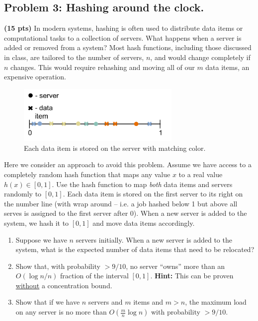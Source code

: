 \documentclass[10pt]{article}
\begin{document}
\subsection{Problem 3: Hashing around the clock.}

\textbf{(15 pts)} In modern systems, hashing is often used to distribute data items or computational tasks to a collection of servers. What happens when a server is added or removed from a system? Most hash functions, including those discussed in class, are tailored to the number of servers, $n$, and would change completely if $n$ changes. This would require rehashing and moving all of our $m$ data items, an expensive operation.

\begin{figure}[h]
	\centering
	\includegraphics[width=0.7\textwidth]{consistentHashing.png}
	\caption{Each data item is stored on the server with matching color.}
\end{figure}


Here we consider an approach to avoid this problem. Assume we have access to a completely random hash function that maps any value $x$ to a real value $h(x) \in [0,1]$. Use the hash function to map \emph{both} data items and servers randomly to $[0,1]$. Each data item is stored on the first server to its right on the number line (with wrap around -- i.e. a job hashed below 1 but above all serves is assigned to the first server after 0). When a new server is added to the system, we hash it to $[0,1]$ and move data items accordingly.

\begin{enumerate}
	\item Suppose we have $n$ servers initially. When a new server is added to the system, what is the expected number of data items that need to be relocated? 
	
	\item Show that, with probability $>9/10$, no server ``owns'' more than an $O(\log n /n)$ fraction of the interval $[0,1]$. 
	\textbf{Hint:} This can be proven \underline{without} a concentration bound.
	
	\item Show that if we have $n$ servers and $m$ items and $m > n$, the maximum load on any server is no more than $O(\frac{m}{n}\log n)$ with probability $> 9/10$. 
\end{enumerate}
\end{document}
